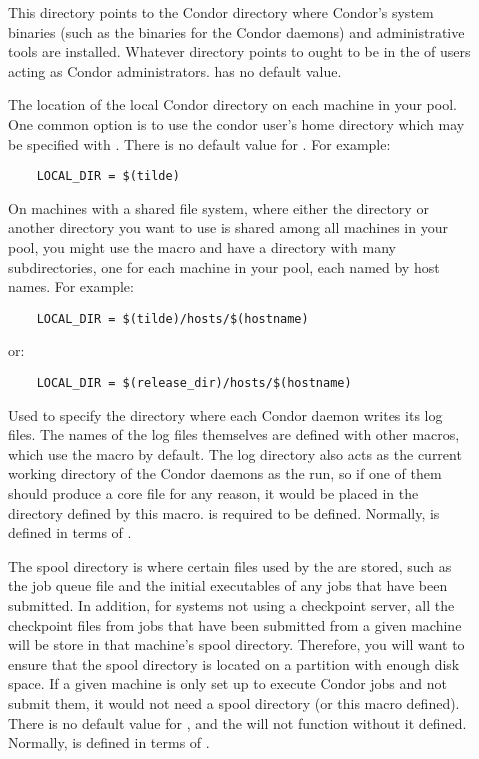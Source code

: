 \begin{description}
\item[] \label{param:Sbin} This directory points to the
  Condor directory where Condor's system binaries (such as the
  binaries for the Condor daemons) and administrative tools are
  installed.  Whatever directory  points to ought
  to be in the  of users acting as Condor
  administrators.   has no default value.

\item[] \label{param:LocalDir} The location of the
  local Condor directory on each machine in your pool.  One common
  option is to use the condor user's home directory which may be
  specified with .  There is no default value for
  .  For example:
  \begin{verbatim}
    LOCAL_DIR = $(tilde)
  \end{verbatim}
  
  On machines with a shared file system, where either the
   directory or another directory you want to use is
  shared among all machines in your pool, you might use the
   macro and have a directory with many
  subdirectories, one for each machine in your pool, each named by
  host names.  For example:
  \begin{verbatim}
    LOCAL_DIR = $(tilde)/hosts/$(hostname)      
  \end{verbatim}
  or:
  \begin{verbatim}
    LOCAL_DIR = $(release_dir)/hosts/$(hostname)
  \end{verbatim}
  
\item[] \label{param:Log} Used to specify the
  directory where each Condor daemon writes its log files.  The names
  of the log files themselves are defined with other macros, which use
  the  macro by default.  The log directory also acts as
  the current working directory of the Condor daemons as the run, so
  if one of them should produce a core file for any reason, it would
  be placed in the directory defined by this macro.   is
  required to be defined.  Normally,  is defined in
  terms of .
  
\item[] \label{param:Spool} The spool directory is where
  certain files used by the  are stored, such as the
  job queue file and the initial executables of any jobs that have
  been submitted.  In addition, for systems not using a checkpoint
  server, all the checkpoint files from jobs that have been submitted
  from a given machine will be store in that machine's spool
  directory.  Therefore, you will want to ensure that the spool
  directory is located on a partition with enough disk space.  If a
  given machine is only set up to execute Condor jobs and not submit
  them, it would not need a spool directory (or this macro defined).
  There is no default value for , and the 
  will not function without it  defined.  Normally,
   is defined in terms of .
  

\end{description}
